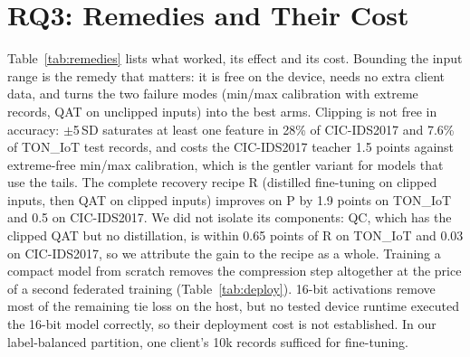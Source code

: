 \documentclass[sigplan,10pt,review,anonymous,nonacm]{acmart}
\newcommand{\cic}{CIC-IDS2017\xspace}
\newcommand{\ton}{TON\_IoT\xspace}
\begin{document}
\section{RQ3: Remedies and Their Cost}\label{sec:rq3}
Table~\ref{tab:remedies} lists what worked, its effect and its cost. Bounding the input range is the
remedy that matters: it is free on the device, needs no extra client data, and turns the two failure
modes (min/max calibration with extreme records, QAT on unclipped inputs) into the best arms.
Clipping is not free in accuracy: $\pm$5\,SD saturates at least one feature in 28\% of \cic and 7.6\% of
\ton test records, and costs the \cic teacher 1.5 points against extreme-free min/max calibration, which is
the gentler variant for models that use the tails. The complete recovery recipe R (distilled fine-tuning
on clipped inputs, then QAT on clipped inputs) improves on P by 1.9 points on \ton and 0.5 on \cic. We did
not isolate its components: QC, which has the clipped QAT but no distillation, is within 0.65 points of R
on \ton and 0.03 on \cic, so we attribute the gain to the recipe as a whole. Training a compact model from
scratch removes the compression step altogether at the price of a second federated training
(Table~\ref{tab:deploy}). 16-bit activations remove most of the remaining tie loss on the host, but no
tested device runtime executed the 16-bit model correctly, so their deployment cost is not established.
In our label-balanced partition, one client's 10k records sufficed for fine-tuning.
\end{document}
